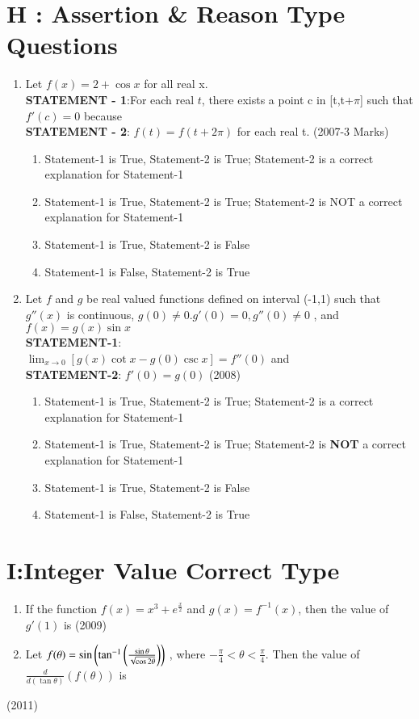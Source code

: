 \documentclass[journal,,12pt,twocolumn]{IEEEtran}
\theoremstyle{remark}
\begin{document}
\section*{H : Assertion \& Reason Type Questions}
\begin{enumerate}
    \item Let $f(x)=2 + \cos{x}$ for all real x.\\
    \textbf{STATEMENT - 1}:For each real $t$, there exists a point c in [t,t+$\pi$] such that $f'(c)=0$ because \\
    \textbf{STATEMENT - 2}: $f(t)=f(t+2\pi)$ for each real t.
    \hfill{(2007-3 Marks)}
    \begin{enumerate}[label=(\alph*)]
        \item Statement-1 is True, Statement-2 is True; Statement-2 is a correct explanation for Statement-1
        \item Statement-1 is True, Statement-2 is True; Statement-2 is NOT a correct explanation for Statement-1
        \item Statement-1 is True, Statement-2 is False 
        \item Statement-1 is False, Statement-2 is True
    \end{enumerate}
\item Let $f$ and $g$ be real valued functions defined on interval (-1,1) such that $g''(x)$ is continuous, $g(0)\neq0$.$g'(0)=0, g''(0)\neq0$ , and $f(x)=g(x)\sin{x}$\\
\textbf{STATEMENT-1}:\\
$\lim _{x \to 0}[g(x)\cot{x}-g(0)\csc{x}]=f''(0)$ and\\
\textbf{STATEMENT-2}: $f'(0)=g(0)$
\hfill{(2008)}
\begin{enumerate}[label=(\alph*)]
        \item Statement-1 is True, Statement-2 is True; Statement-2 is a correct explanation for Statement-1
        \item Statement-1 is True, Statement-2 is True; Statement-2 is \textbf{NOT} a correct explanation for Statement-1
        \item Statement-1 is True, Statement-2 is False 
        \item Statement-1 is False, Statement-2 is True
    \end{enumerate}
\end{enumerate}
\section*{I:Integer Value Correct Type}
\begin{enumerate}
    \item If the function $f(x)=x^3+e^{\frac{x}{2}}$ and $g(x)=f^{-1}(x)$, then the value of $g'(1)$ is 
    \hfill{(2009)}\\
    \item    Let $f(\theta)=\sin{\ensuremath{\left(\tan^{-1}{\left(\frac{\sin{\theta}}{\sqrt{\cos{2\theta}}}\right)}\right)}}$ , where $-\frac{\pi}{4}<\theta<\frac{\pi}{4}$. Then the value of $\frac{d}{d(\tan{\theta})}(f(\theta))$ is
\end{enumerate}  
\hfill{(2011)}
\end{document}
